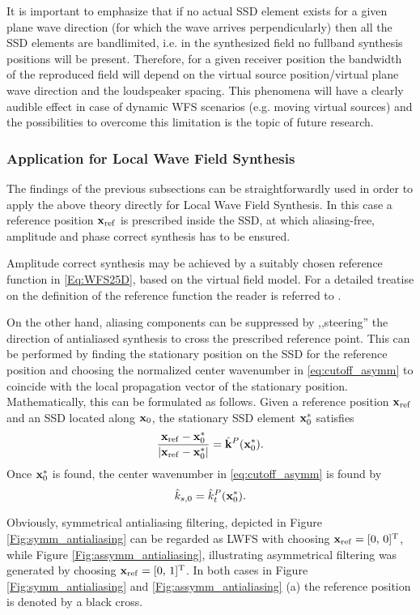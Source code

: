 \documentclass[conference]{IEEEtran}
\begin{document}
It is important to emphasize that if no actual SSD element exists for a given plane wave direction (for which the wave arrives perpendicularly) then all the SSD elements are bandlimited, i.e. in the synthesized field no fullband synthesis positions will be present.
Therefore, for a given receiver position the bandwidth of the reproduced field will depend on the virtual source position/virtual plane wave direction and the loudspeaker spacing.
This phenomena will have a clearly audible effect in case of dynamic WFS scenarios (e.g. moving virtual sources) and the possibilities to overcome this limitation is the topic of future research.

\subsubsection{Application for Local Wave Field Synthesis}
The findings of the previous subsections can be straightforwardly used in order to apply the above theory directly for Local Wave Field Synthesis.
In this case a reference position $\mathbf{x}_{\mathrm{ref}}$ is prescribed inside the SSD, at which aliasing-free, amplitude and phase correct synthesis has to be ensured.

Amplitude correct synthesis may be achieved by a suitably chosen reference function in \eqref{Eq:WFS25D}, based on the virtual field model.
For a detailed treatise on the definition of the reference function the reader is referred to \cite{Firtha2019phd}.

On the other hand, aliasing components can be suppressed by ,,steering'' the direction of antialiased synthesis to cross the prescribed reference point.
This can be performed by finding the stationary position on the SSD for the reference position and choosing the normalized center wavenumber in \eqref{eq:cutoff_asymm} to coincide with the local propagation vector of the stationary position.
Mathematically, this can be formulated as follows.
Given a reference position $\mathbf{x}_{\mathrm{ref}}$ and an SSD located along $\mathbf{x}_0$, the stationary SSD element $\mathbf{x}_0^*$ satisfies
\begin{equation}
    \frac{\mathbf{x}_{\mathrm{ref}} - \mathbf{x}_0^*}{\left| \mathbf{x}_{\mathrm{ref}} - \mathbf{x}_0^* \right|} = \hat{\mathbf{k}}^P(\mathbf{x}_0^*).
\end{equation}
Once $\mathbf{x}_0^*$ is found, the center wavenumber in \eqref{eq:cutoff_asymm} is found by
\begin{equation}
    \hat{k}_{s,0} = \hat{k}_t^P(\mathbf{x}_0^*).
\end{equation}

Obviously, symmetrical antialiasing filtering, depicted in Figure \ref{Fig:symm_antialiasing} can be regarded as LWFS with choosing $\mathbf{x}_{\mathrm{ref}} = [0, \, 0]^{\mathrm{T}}$,
while Figure \ref{Fig:assymm_antialiasing}, illustrating asymmetrical filtering was generated by choosing $\mathbf{x}_{\mathrm{ref}} = [0, \, 1]^{\mathrm{T}}$.
In both cases in Figure \ref{Fig:symm_antialiasing} and \ref{Fig:assymm_antialiasing} (a) the reference position is denoted by a black cross.
\end{document}
